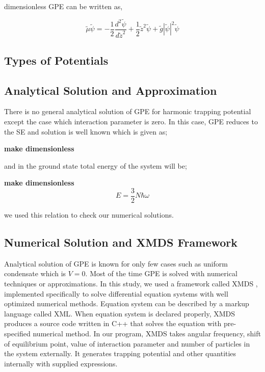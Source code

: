 \documentclass[a4paper,times,12pt]{article}
\begin{document}
dimensionless GPE can be written as,

\begin{equation}
\label{eq:GPE_dimensionless}
\widetilde{\mu} \widetilde{\psi} = -\frac{1}{2}\frac{d^2\widetilde{\psi}}{d\widetilde{z}^2} + \frac{1}{2}\widetilde{z}^2\widetilde{\psi} + \widetilde{g}|\widetilde{\psi}|^2 \widetilde{\psi}
\end{equation}



\subsection{Types of Potentials}


\subsection{Analytical Solution and Approximation}

There is no general analytical solution of GPE for harmonic trapping potential except the case which interaction parameter is zero. In this case, GPE reduces to the SE and solution is well known which is given as;

\textbf{make dimensionless}
\begin{equation}
\label{eq:GPE_SE}
\end{equation}

and in the ground state total energy of the system will be;

\textbf{make dimensionless}
\begin{equation}
\label{eq:GPE_no_inter_GSE}
E = \frac{3}{2}N\hbar\omega
\end{equation}

we used this relation to check our numerical solutions. 


\subsection{Numerical Solution and XMDS Framework}

Analytical solution of GPE is known for only few cases such as uniform condensate which is $V = 0$. Most of the time GPE is solved with numerical techniques or approximations. In this study, we used a framework called XMDS \cite{dennis2013xmds2}, implemented specifically to solve differential equation systems with well optimized numerical methods. Equation system can be described by a markup language called XML.  When equation system is declared properly, XMDS produces a source code written in C++ that solves the equation with pre-specified numerical method. In our program, XMDS takes angular frequency, shift of equilibrium point, value of interaction parameter and number of particles in the system externally. It generates trapping potential and other quantities internally with supplied expressions.
\end{document}
